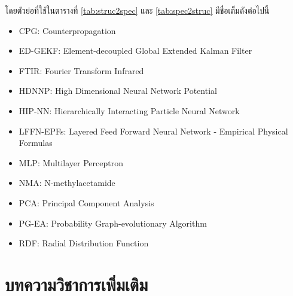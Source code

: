 โดยตัวย่อที่ใช้ในตารางที่ \ref{tab:struc2spec} และ \ref{tab:spec2struc} มีชื่อเต็มดังต่อไปนี้
%
\begin{itemize}[topsep=0pt,noitemsep]\setlength\itemsep{0.5em}
    \item CPG: Counterpropagation

    \item ED-GEKF: Element-decoupled Global Extended Kalman Filter

    \item FTIR: Fourier Transform Infrared

    \item HDNNP: High Dimensional Neural Network Potential

    \item HIP-NN: Hierarchically Interacting Particle Neural Network

    \item LFFN-EPFs: Layered Feed Forward Neural Network - Empirical Physical Formulas

    \item MLP: Multilayer Perceptron

    \item NMA: N-methylacetamide

    \item PCA: Principal Component Analysis

    \item PG-EA: Probability Graph-evolutionary Algorithm

    \item RDF: Radial Distribution Function
\end{itemize}


\section{บทความวิชาการเพิ่มเติม}
\label{sec:pred_misc_papers}

